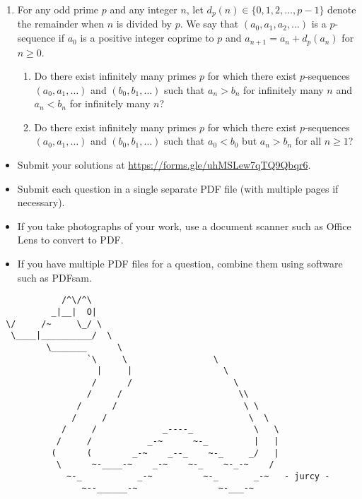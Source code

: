 \documentclass{article}
\begin{document}
\begin{enumerate}[leftmargin=0pt, itemsep=18pt]
\item %
For any odd prime $p$ and any integer $n$, let $d_p(n) \in \{0, 1, 2, \dotsc, p-1\}$ denote the remainder when $n$ is divided by $p$.
We say that $(a_0, a_1, a_2, \dotsc)$ is a $p$-sequence if $a_0$ is a positive integer coprime to $p$ and $a_{n+1} = a_n +d_p(a_n)$ for $n \geq 0$.
\begin{enumerate}[label=(\alph*)]
  \item Do there exist infinitely many primes $p$ for which there exist $p$-sequences $(a_0, a_1, \dotsc)$ and $(b_0, b_1, \dotsc)$ such that $a_n > b_n$ for infinitely many $n$ and $a_n < b_n$ for infinitely many $n$?
  \item Do there exist infinitely many primes $p$ for which there exist $p$-sequences $(a_0, a_1, \dotsc)$ and $(b_0, b_1, \dotsc)$ such that $a_0 < b_0$ but $a_n > b_n$ for all $n \geq 1$?
\end{enumerate}

\end{enumerate}


\vfill
\vfill
\begin{itemize}
	\item Submit your solutions at \url{https://forms.gle/uhMSLew7qTQ9Qbqr6}.
	\item Submit each question in a single separate PDF file (with multiple pages if necessary).
	\item If you take photographs of your work, use a document scanner such as Office Lens to convert to PDF.
	\item If you have multiple PDF files for a question, combine them using software such as PDFsam.
\end{itemize}

\vfill
\centering
\small
\begin{BVerbatim}
            /^\/^\
          _|__|  O|
 \/     /~     \_/ \
  \____|__________/  \
         \_______      \
                 `\     \                 \
                   |     |                  \
                  /      /                    \
                 /     /                       \\
               /      /                         \ \
              /     /                            \  \
            /     /             _----_            \   \
           /     /           _-~      ~-_         |   |
          (      (        _-~    _--_    ~-_     _/   |
           \      ~-____-~    _-~    ~-_    ~-_-~    /
             ~-_           _-~          ~-_       _-~   - jurcy -
                ~--______-~                ~-___-~
\end{BVerbatim}
\end{document}
